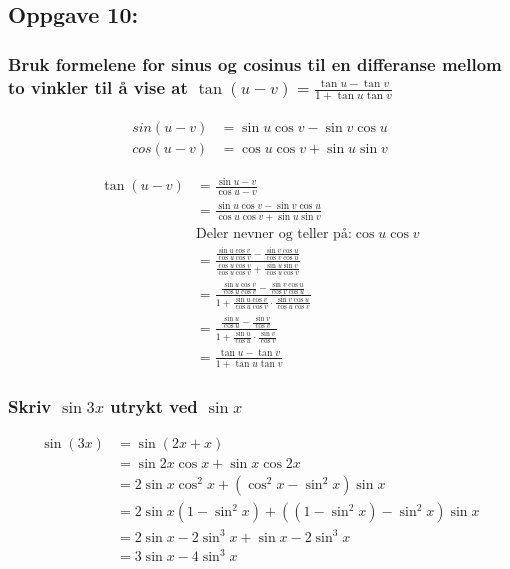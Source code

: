 \documentclass{article}
\begin{document}

\subsection{Oppgave 10: }

\subsubsection{Bruk formelene for sinus og cosinus til en differanse mellom to vinkler til å vise at $\tan(u-v)=\frac{\tan u-\tan v}{1+\tan u \tan v}$}


\begin{align*}
    sin(u-v) &= \sin u\cos v - \sin v \cos u  \\
    cos(u-v) &= \cos u\cos v +\sin u \sin v
\end{align*}

\begin{align*}
    \tan(u-v) &= \frac{\sin u-v}{\cos u-v} \\
    &= \frac{\sin u \cos v - \sin v \cos u}{\cos u \cos v + \sin u \sin v} \\
    & \text{Deler nevner og teller på:} \cos u \cos v \\
    &= \frac{\frac{\sin u \cos v}{\cos u \cos v} - \frac{\sin v \cos u}{\cos v \cos u}}{\frac{\cos u \cos v}{\cos u \cos v} + \frac{\sin u \sin v}{\cos u \cos v}} \\
    &= \frac{\frac{\sin u \cos v}{\cos u \cos v} - \frac{\sin v \cos u}{\cos v \cos u}}{1 + \frac{\sin u \cos v}{\cos u \cos v} \cdot \frac{\sin v \cos u}{\cos u \cos v}} \\
    &= \frac{\frac{\sin u}{\cos u} - \frac{\sin v}{\cos v}}{1 + \frac{\sin u }{\cos u } \cdot \frac{\sin v}{\cos v}} \\
    &= \frac{\tan u - \tan v}{1 + \tan u \tan v}
\end{align*}

\subsubsection{Skriv $\sin 3x$ utrykt ved $\sin x$}

\begin{align*}
    \sin(3x) &= \sin(2x+x) \\
    &= \sin 2x \cos x +\sin x \cos 2x \\
    &= 2 \sin x \cos^2x + (\cos^2x - \sin^2x)\sin x \\
    &= 2 \sin x (1-\sin^2x) + ((1-\sin^2x)-\sin^2x)\sin x \\
    &= 2 \sin x - 2 \sin^3x + \sin x - 2 \sin^3x \\
    &= 3 \sin x - 4 \sin^3x
\end{align*}
\end{document}
